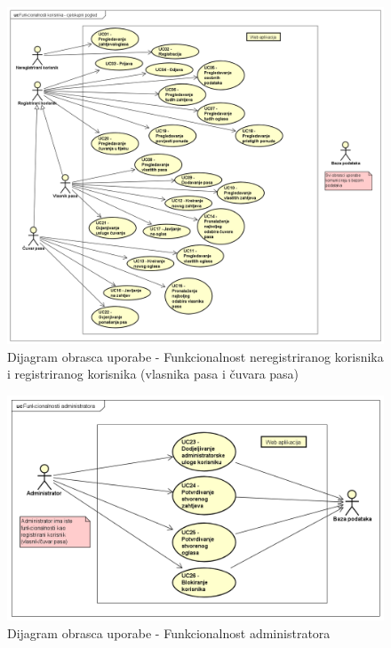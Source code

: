 					\begin{figure}[htb]
						\centering
						\includegraphics[width=14cm]{slike/Dijagram obrazaca uporabe - korisnik}
						\caption{Dijagram obrasca uporabe - Funkcionalnost neregistriranog korisnika i registriranog korisnika (vlasnika pasa i čuvara pasa)}
						\label{fig:DOU-korisnici}
					\end{figure}
				\eject		
					\begin{figure}[htb]
						\centering
						\includegraphics[width=14cm]{slike/Dijagram obrazaca uporabe - administrator}
						\caption{Dijagram obrasca uporabe - Funkcionalnost administratora}
						\label{fig:DOU-administrator}
					\end{figure}
				\eject		
				
